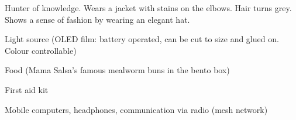 \begin{npcBox}[title=Books]
    \begin{consequences}
    \item {}
    \item {}
    \item {}
    \end{consequences}

    \begin{npcDescription}
    Hunter of knowledge. Wears a jacket with stains on the elbows. Hair turns grey. Shows a sense of fashion by wearing an elegant hat.
    \end{npcDescription}


    \begin{equipment}
    \item Light source (OLED film: battery operated, can be cut to size and glued on. Colour controllable)
    \item Food (Mama Salsa's famous mealworm buns in the bento box)
    \item First aid kit
    \item Mobile computers, headphones, communication via radio (mesh network)
    \end{equipment}

\end{npcBox}

